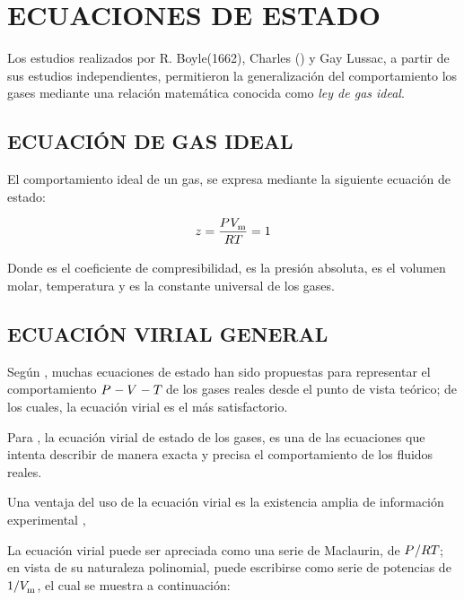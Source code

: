 \section{ECUACIONES DE ESTADO}
    Los estudios realizados por R. Boyle(1662), Charles () y Gay Lussac, a partir de sus estudios independientes, permitieron la generalización del comportamiento los gases mediante una relación matemática conocida como {\it ley de gas ideal}. 

\subsection{ECUACIÓN DE GAS IDEAL}
    El comportamiento ideal de un gas, se expresa mediante la siguiente ecuación de estado:

    \begin{equation}
       z = \frac{P_{}^{}  {V_{\text{m}}^{}} }{R T_{}} = 1 
    \end{equation}

    Donde {\zFactor} es el coeficiente de compresibilidad, {\pressure} es la presión absoluta, {\Vmolar} es el volumen molar, {\temperatureAbsolute} temperatura y {\univConstGasEos} es la constante universal de los gases.

\subsection{ECUACIÓN VIRIAL GENERAL}
    \label{cap2:subsec:tagEqnvirial}

    Según \parencite{Dymond2002}, muchas ecuaciones de estado han sido propuestas para representar el comportamiento $P_{}^{}-{V_{}^{}}-T_{}$ de los gases reales desde el punto de vista teórico; de los cuales, la ecuación virial es el más satisfactorio.

    Para \parencite[p. 37]{Sengers1987equations}, la ecuación virial de estado de los gases, es una de las ecuaciones que intenta describir de manera exacta y precisa el comportamiento de los fluidos reales. 

    Una ventaja del uso de la ecuación virial es la existencia amplia de información experimental \Parencite[p. 38]{Sengers1987equations}, 

    La ecuación virial puede ser apreciada como una serie de Maclaurin, de ${P_{}^{}}/{R T_{}}$; en vista de su naturaleza polinomial, puede escribirse como serie de potencias de $1/ {V_{\text{m}}^{}} $, el cual se muestra a continuación:

